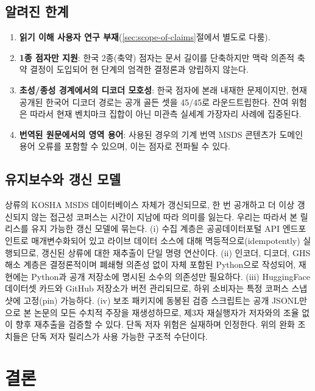 \documentclass[journal]{IEEEtran}
\begin{document}
\subsection{알려진 한계}

\begin{enumerate}
\item \textbf{읽기 이해 사용자 연구 부재}(\ref{sec:scope-of-claims}절에서 별도로 다룸).
\item \textbf{1종 점자만 지원}: 한국 2종(축약) 점자는 문서 길이를 단축하지만 맥락 의존적 축약 결정이 도입되어 현 단계의 엄격한 결정론과 양립하지 않는다.
\item \textbf{초성/종성 경계에서의 디코더 모호성}: 한국 점자에 본래 내재한 문제이지만, 현재 공개된 한국어 디코더 경로는 공개 골든 셋을 45/45로 라운드트립한다. 잔여 위험은 따라서 현재 벤치마크 집합이 아닌 미관측 실세계 가장자리 사례에 집중된다.
\item \textbf{번역된 원문에서의 영역 용어}: 사용된 경우의 기계 번역 MSDS 콘텐츠가 도메인 용어 오류를 포함할 수 있으며, 이는 점자로 전파될 수 있다.
\end{enumerate}

\subsection{유지보수와 갱신 모델}
\label{sec:maintenance}

상류의 KOSHA MSDS 데이터베이스 자체가 갱신되므로, 한 번 공개하고 더 이상 갱신되지 않는 접근성 코퍼스는 시간이 지남에 따라 의미를 잃는다. 우리는 따라서 본 릴리스를 유지 가능한 갱신 모델에 묶는다. (i) 수집 계층은 공공데이터포털 API 엔드포인트로 매개변수화되어 있고 라이브 데이터 소스에 대해 멱등적으로(idempotently) 실행되므로, 갱신된 상류에 대한 재추출이 단일 명령 연산이다. (ii) 인코더, 디코더, GHS 해소 계층은 결정론적이며 폐쇄형 의존성 없이 자체 포함된 Python으로 작성되어, 재현에는 Python과 공개 저장소에 명시된 소수의 의존성만 필요하다. (iii) HuggingFace 데이터셋 카드와 GitHub 저장소가 버전 관리되므로, 하위 소비자는 특정 코퍼스 스냅샷에 고정(pin) 가능하다. (iv) 보조 패키지에 동봉된 검증 스크립트는 공개 JSONL만으로 본 논문의 모든 수치적 주장을 재생성하므로, 제3자 재실행자가 저자와의 조율 없이 향후 재추출을 검증할 수 있다. 단독 저자 위험은 실재하며 인정한다. 위의 완화 조치들은 단독 저자 릴리스가 사용 가능한 구조적 수단이다.

\section{결론}
\label{sec:conclusion}
\end{document}
